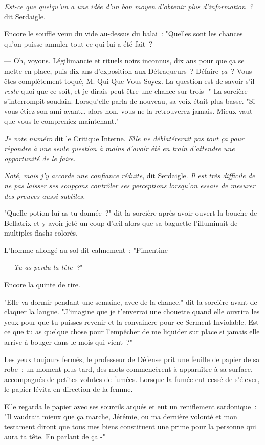 \emph{Est-ce que quelqu'un a une idée d'un bon moyen d'obtenir plus d'information~?} dit Serdaigle.

Encore le souffle venu du vide au-dessus du balai~: "Quelles sont les chances qu'on puisse annuler tout ce qui lui a été fait~?

--- Oh, voyons. Légilimancie et rituels noirs inconnus, dix ans pour que ça se mette en place, puis dix ans d'exposition aux Détraqueurs~? Défaire \emph{ça}~? Vous êtes complètement toqué, M. Qui-Que-Vous-Soyez. La question est de savoir s'il \emph{reste} quoi que ce soit, et je dirais peut-être une chance sur trois -" La sorcière s'interrompit soudain. Lorsqu'elle parla de nouveau, sa voix était plus basse. "Si vous étiez son ami avant… alors non, vous ne la retrouverez jamais. Mieux vaut que vous le compreniez maintenant."

\emph{Je vote numéro} dit le Critique Interne. \emph{Elle ne déblatérerait pas tout ça pour répondre à une seule question à moins d'avoir été en train d'attendre une opportunité de le faire.}

\emph{Noté, mais j'y accorde une confiance réduite}, dit Serdaigle. \emph{Il est très difficile de ne pas laisser ses soupçons contrôler ses perceptions lorsqu'on essaie de mesurer des preuves aussi subtiles.}

"Quelle potion lui as-tu donnée~?" dit la sorcière après avoir ouvert la bouche de Bellatrix et y avoir jeté un coup d'œil alors que sa baguette l'illuminait de multiples flashs colorés.

L'homme allongé au sol dit calmement~: "Pimentine -

--- \emph{Tu as perdu la tête~?}"

Encore la quinte de rire.

"Elle va dormir pendant une semaine, avec de la chance," dit la sorcière avant de claquer la langue. "J'imagine que je t'enverrai une chouette quand elle ouvrira les yeux pour que tu puisses revenir et la convaincre pour ce Serment Inviolable. Est-ce que tu as quelque chose pour l'empêcher de me liquider sur place si jamais elle arrive à bouger dans le mois qui vient~?"

Les yeux toujours fermés, le professeur de Défense prit une feuille de papier de sa robe~; un moment plus tard, des mots commencèrent à apparaître à sa surface, accompagnés de petites volutes de fumées. Lorsque la fumée eut cessé de s'élever, le papier lévita en direction de la femme.

Elle regarda le papier avec ses sourcils arqués et eut un reniflement sardonique~: "Il vaudrait mieux que ça marche, Jérémie, ou ma dernière volonté et mon testament diront que tous mes biens constituent une prime pour la personne qui aura ta tête. En parlant de ça -"

